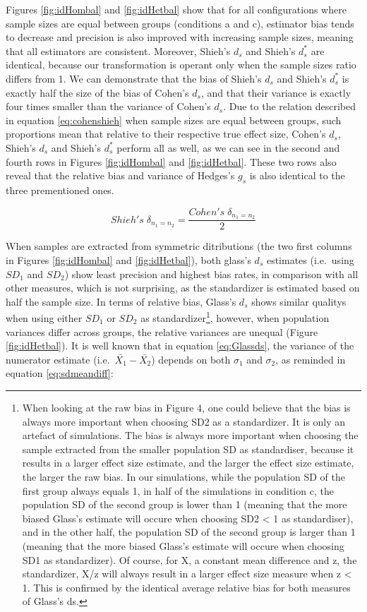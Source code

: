 \documentclass[
  man,floatsintext]{apa6}
\begin{document}
Figures \ref{fig:idHombal} and \ref{fig:idHetbal} show that for all configurations where sample sizes are equal between groups (conditions a and c), estimator bias tends to decrease and precision is also improved with increasing sample sizes, meaning that all estimators are consistent. Moreover, Shieh's \(d_s\) and Shieh's \(d^*_s\) are identical, because our transformation is operant only when the sample sizes ratio differs from 1. We can demonstrate that the bias of Shieh's \(d_s\) and Shieh's \(d_s^*\) is exactly half the size of the bias of Cohen's \(d_s\), and that their variance is exactly four times smaller than the variance of Cohen's \(d_s\). Due to the relation described in equation \ref{eq:cohenshieh} when sample sizes are equal between groups, such proportions mean that relative to their respective true effect size, Cohen's \(d_s\), Shieh's \(d_s\) and Shieh's \(d^*_s\) perform all as well, as we can see in the second and fourth rows in Figures \ref{fig:idHombal} and \ref{fig:idHetbal}. These two rows also reveal that the relative bias and variance of Hedges's \(g_s\) is also identical to the three prementioned ones.

\begin{equation} 
Shieh's \; \delta_{n_1=n_2}= \frac{Cohen's \; \delta_{n_1=n_2}}{2}
\label{eq:cohenshieh}
\end{equation}

When samples are extracted from symmetric ditributions (the two first columns in Figures \ref{fig:idHombal} and \ref{fig:idHetbal}), both glass's \(d_s\) estimates (i.e.~using \(SD_1\) and \(SD_2\)) show least precision and highest bias rates, in comparison with all other measures, which is not surprising, as the standardizer is estimated based on half the sample size. In terms of relative bias, Glass's \(d_s\) shows similar qualitys when using either \(SD_1\) or \(SD_2\) as standardizer\footnote{When looking at the raw bias in Figure 4, one could believe that the bias is always more important when choosing SD2 as a standardizer. It is only an artefact of simulations. The bias is always more important when choosing the sample extracted from the smaller population SD as standardiser, because it results in a larger effect size estimate, and the larger the effect size estimate, the larger the raw bias. In our simulations, while the population SD of the first group always equals 1, in half of the simulations in condition c, the population SD of the second group is lower than 1 (meaning that the more biased Glass's estimate will occure when choosing SD2 < 1 as standardiser), and in the other half, the population SD of the second group is larger than 1 (meaning that the more biased Glass's estimate will occure when choosing SD1 as standardizer). Of course, for X, a constant mean difference and z, the standardizer, X/z will always result in a larger effect size measure when z < 1. This is confirmed by the identical average relative bias for both measures of Glass's ds.}, however, when population variances differ across groups, the relative variances are unequal (Figure \ref{fig:idHetbal}). It is well known that in equation \ref{eq:Glassds}, the variance of the numerator estimate (i.e.~\(\bar{X_1}-\bar{X_2}\)) depends on both \(\sigma_1\) and \(\sigma_2\), as reminded in equation \ref{eq:sdmeandiff}:
\end{document}
